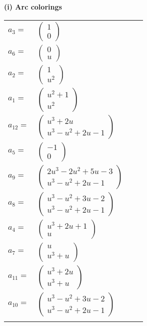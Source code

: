 \documentclass[1p]{elsarticle_modified}
\theoremstyle{definition}
\begin{document}
\flushleft \textbf{(i) Arc colorings}\\
\begin{tabular}{m{7pt} m{180pt} m{7pt} m{180pt} }
\flushright $a_{3}=$&$\begin{pmatrix}1\\0\end{pmatrix}$ \\
\flushright $a_{6}=$&$\begin{pmatrix}0\\u\end{pmatrix}$ \\
\flushright $a_{2}=$&$\begin{pmatrix}1\\u^2\end{pmatrix}$ \\
\flushright $a_{1}=$&$\begin{pmatrix}u^2+1\\u^2\end{pmatrix}$ \\
\flushright $a_{12}=$&$\begin{pmatrix}u^3+2 u\\u^3- u^2+2 u-1\end{pmatrix}$ \\
\flushright $a_{5}=$&$\begin{pmatrix}-1\\0\end{pmatrix}$ \\
\flushright $a_{9}=$&$\begin{pmatrix}2 u^3-2 u^2+5 u-3\\u^3- u^2+2 u-1\end{pmatrix}$ \\
\flushright $a_{8}=$&$\begin{pmatrix}u^3- u^2+3 u-2\\u^3- u^2+2 u-1\end{pmatrix}$ \\
\flushright $a_{4}=$&$\begin{pmatrix}u^3+2 u+1\\u\end{pmatrix}$ \\
\flushright $a_{7}=$&$\begin{pmatrix}u\\u^3+u\end{pmatrix}$ \\
\flushright $a_{11}=$&$\begin{pmatrix}u^3+2 u\\u^3+u\end{pmatrix}$ \\
\flushright $a_{10}=$&$\begin{pmatrix}u^3- u^2+3 u-2\\u^3- u^2+2 u-1\end{pmatrix}$\\&\end{tabular}
\end{document}

